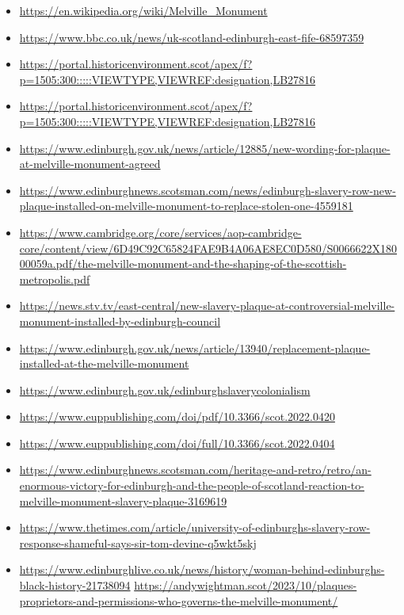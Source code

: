 \documentclass{scrartcl}
\begin{document}
\begin{itemize}
    \item \url{https://en.wikipedia.org/wiki/Melville_Monument}
    \item \url{https://www.bbc.co.uk/news/uk-scotland-edinburgh-east-fife-68597359}
    \item \url{https://portal.historicenvironment.scot/apex/f?p=1505:300:::::VIEWTYPE,VIEWREF:designation,LB27816}
    \item \url{https://portal.historicenvironment.scot/apex/f?p=1505:300:::::VIEWTYPE,VIEWREF:designation,LB27816}
    \item \url{https://www.edinburgh.gov.uk/news/article/12885/new-wording-for-plaque-at-melville-monument-agreed}
    \item \url{https://www.edinburghnews.scotsman.com/news/edinburgh-slavery-row-new-plaque-installed-on-melville-monument-to-replace-stolen-one-4559181}
    \item \url{https://www.cambridge.org/core/services/aop-cambridge-core/content/view/6D49C92C65824FAE9B4A06AE8EC0D580/S0066622X18000059a.pdf/the-melville-monument-and-the-shaping-of-the-scottish-metropolis.pdf}
    \item \url{https://news.stv.tv/east-central/new-slavery-plaque-at-controversial-melville-monument-installed-by-edinburgh-council}
    \item \url{https://www.edinburgh.gov.uk/news/article/13940/replacement-plaque-installed-at-the-melville-monument}
    \item \url{https://www.edinburgh.gov.uk/edinburghslaverycolonialism}
    \item \url{https://www.euppublishing.com/doi/pdf/10.3366/scot.2022.0420}
    \item \url{https://www.euppublishing.com/doi/full/10.3366/scot.2022.0404}
    \item \url{https://www.edinburghnews.scotsman.com/heritage-and-retro/retro/an-enormous-victory-for-edinburgh-and-the-people-of-scotland-reaction-to-melville-monument-slavery-plaque-3169619}
    \item \url{https://www.thetimes.com/article/university-of-edinburghs-slavery-row-response-shameful-says-sir-tom-devine-q5wkt5skj}
    \item \url{https://www.edinburghlive.co.uk/news/history/woman-behind-edinburghs-black-history-21738094}
   \url {https://andywightman.scot/2023/10/plaques-proprietors-and-permissions-who-governs-the-melville-monument/}
    
\end{itemize}
\end{document}
